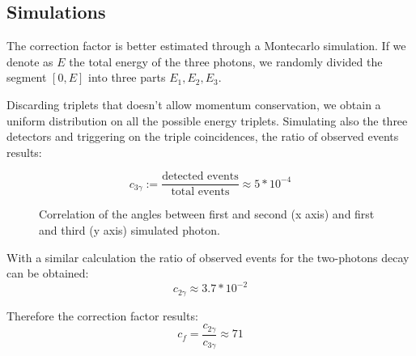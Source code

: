 \documentclass[main.tex]{subfiles}
\begin{document}
\subsection{Simulations}

The correction factor is better estimated through a Montecarlo simulation. If we denote as $E$ the total energy of the three photons, we randomly divided the segment $[0,E]$ into three parts $E_1,E_2,E_3$.
%
%
%

Discarding triplets that doesn't allow momentum conservation, we obtain a uniform distribution on all the possible energy triplets. %
Simulating also the three detectors and triggering on the triple coincidences, the ratio of observed events results:

\begin{equation*}
  c_{3\gamma} := \frac{\text{detected events}}{\text{total events}} \approx 5*10^{-4}
\end{equation*}

\begin{figure}[H]
  \centering
  \caption{Correlation of the angles between first and second (x axis) and first and third (y axis) simulated photon.}
  \label{fig:sim:ang:corr}
\end{figure}

With a similar calculation the ratio of observed events for the two-photons decay can be obtained:
\begin{equation*}
  c_{2\gamma} \approx 3.7*10^{-2}
\end{equation*}

Therefore the correction factor results:
\begin{equation}
  c_f = \frac{c_{2\gamma}}{c_{3\gamma}} \approx 71
\end{equation}
\end{document}
